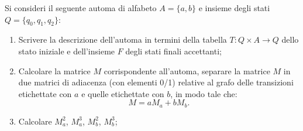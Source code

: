 \begin{ex}
{Si consideri il seguente automa di alfabeto $A = \{a, b\}$ e insieme degli stati $Q = \{q_0, q_1, q_2\}$:}\\

\begin{center}
\end{center}

\begin{enumerate}
    \item {Scrivere la descrizione dell'automa in termini della tabella $T : Q \times A \to Q$ dello stato iniziale e dell'insieme $F$ degli stati finali accettanti;}
    
    \item {Calcolare la matrice $M$ corrispondente all'automa, separare la matrice $M$ in due matrici di adiacenza (con elementi 0/1) relative al grafo delle transizioni etichettate con $a$ e quelle etichettate con $b$, in modo tale che:
    \[ M = aM_a + bM_b. \]
    }
    
    \item {Calcolare $M_a^2$, $M_a^3$, $M_b^2$, $M_b^3$;}
    

\end{enumerate}
\end{ex}
